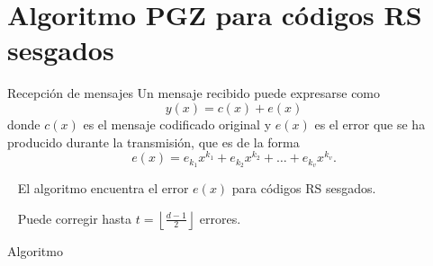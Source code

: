 \documentclass[spanish,aspectratio=169]{beamer}
\begin{document}
\section{Algoritmo PGZ para códigos RS sesgados}

\begin{frame}{Recepción de mensajes}
  Un mensaje recibido puede expresarse como
  \[
  y(x) = c(x) + e(x)
  \]
  donde \(c(x)\) es el mensaje codificado original y \(e(x)\) es el error que se ha producido durante la transmisión, que es de la forma
  \[
  e(x) = e_{k_1}x^{k_1} + e_{k_2}x^{k_2} + \dots + e_{k_v}x^{k_v}.
  \]
  
  \pause
  
  \vspace{1em}

  \faArrowCircleRight~ El algoritmo encuentra el error \(e(x)\) para códigos RS sesgados.

  \faArrowCircleRight~ Puede corregir hasta \(t = \left\lfloor \frac{d - 1}{2} \right\rfloor\) errores.
  
\end{frame}

\begin{frame}{Algoritmo}
  \begin{algorithm}[H]
    \DontPrintSemicolon
  \end{algorithm}
\end{frame}
\end{document}

